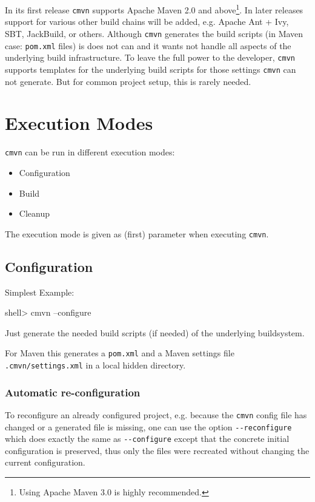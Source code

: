 \documentclass[a4paper,12pt,english,oneside,halfparskip]{scrartcl}
\newcommand{\CMVN}{\texttt{cmvn}}
\newcommand{\cmvn}{\texttt{cmvn}}
\newcommand{\code}[1]{\texttt{#1}}
\newcommand{\pom}{\code{pom.xml}}
\newcommand{\cmdoption}[1]{\code{-{}-#1}}
\begin{document}
In its first release \CMVN{} supports Apache Maven 2.0 and above\footnote{Using Apache Maven 3.0 is highly recommended.}. In later releases support for various other build chains will be added, e.g. Apache Ant + Ivy, SBT, JackBuild, or others. Although \CMVN{} generates the build scripts (in Maven case: \pom{} files) is does not can and it wants not handle all aspects of the underlying build infrastructure. To leave the full power to the developer, \CMVN{} supports templates for the underlying build scripts for those settings \CMVN{} can not generate. But for common project setup, this is rarely needed.

\section{Execution Modes}

\CMVN{} can be run in different execution modes:

\begin{itemize}
 \item Configuration
 \item Build
 \item Cleanup
\end{itemize}

The execution mode is given as (first) parameter when executing \CMVN{}.



\subsection{Configuration}

Simplest Example: 

\begin{Cmdline}
shell> cmvn --configure
\end{Cmdline}

Just generate the needed build scripts (if needed) of the underlying buildsystem.

For Maven this generates a \pom{} and a Maven settings file \code{.cmvn/settings.xml} in a local hidden directory.

\subsubsection{Automatic re-configuration}

To reconfigure an already configured project, e.g. because the \cmvn{} config file has changed or a generated file is missing, one can use the option \cmdoption{reconfigure} which does exactly the same as \cmdoption{configure} except that the concrete initial configuration is preserved, thus only the files were recreated without changing the current configuration. 
\end{document}
